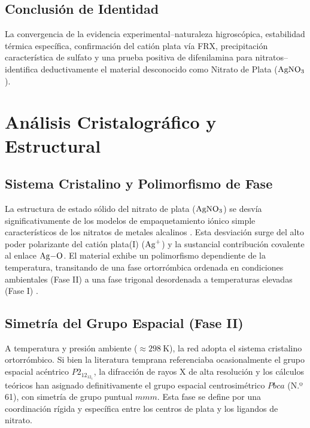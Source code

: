 \documentclass[pdflatex,sn-mathphys-num,draft]{sn-jnl}
\theoremstyle{thmstyleone}%
\theoremstyle{thmstyletwo}%
\theoremstyle{thmstylethree}%
\begin{document}
\subsection{Conclusión de Identidad}
La convergencia de la evidencia experimental--naturaleza higroscópica,
estabilidad térmica específica, confirmación del catión plata vía FRX,
precipitación característica de sulfato y una prueba positiva de difenilamina
para nitratos--identifica deductivamente el material desconocido como Nitrato de
Plata ($\ce{AgNO3}$).

\section{Análisis Cristalográfico y Estructural}
\label{sec:crystallography}

\subsection{Sistema Cristalino y Polimorfismo de Fase}
La estructura de estado sólido del nitrato de plata ($\ce{AgNO3}$) se desvía
significativamente de los modelos de empaquetamiento iónico simple
característicos de los nitratos de metales alcalinos \cite{Singh2017}. Esta
desviación surge del alto poder polarizante del catión plata(I) ($\ce{Ag+}$) y
la sustancial contribución covalente al enlace $\ce{Ag-O}$. El material exhibe
un polimorfismo dependiente de la temperatura, transitando de una fase
ortorrómbica ordenada en condiciones ambientales (Fase II) a una fase trigonal
desordenada a temperaturas elevadas (Fase I) \cite{osti_1279797}.

\subsection{Simetría del Grupo Espacial (Fase II)}
A temperatura y presión ambiente ($\approx \qty{298}{\kelvin}$), la red adopta
el sistema cristalino ortorrómbico. Si bien la literatura temprana referenciaba
ocasionalmente el grupo espacial acéntrico $P2_12_12_1$, la difracción de rayos
X de alta resolución y los cálculos teóricos han asignado definitivamente el
grupo espacial centrosimétrico $Pbca$ (N.º 61), con simetría de grupo puntual
$mmm$. Esta fase se define por una coordinación rígida y específica entre los
centros de plata y los ligandos de nitrato.
\end{document}
